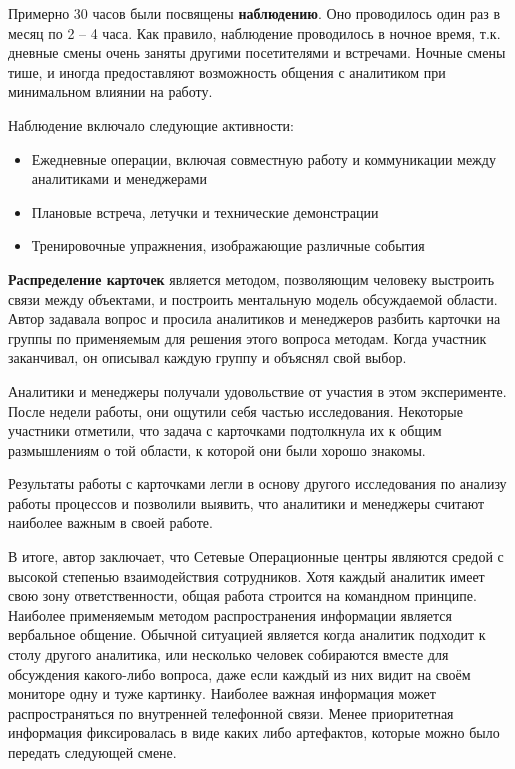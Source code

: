 \documentclass[10pt,a4paper]{article}
\begin{document}
\begin{multicols}{2}
Примерно 30 часов были посвящены \textbf{наблюдению}. Оно проводилось один раз в месяц по 2 -- 4 часа. Как правило, наблюдение проводилось в ночное время, т.к. дневные смены очень заняты другими посетителями и встречами. Ночные смены тише, и иногда предоставляют возможность общения с аналитиком при минимальном влиянии на работу.

Наблюдение включало следующие активности:
\begin{itemize}
\item Ежедневные операции, включая совместную работу и коммуникации между аналитиками и менеджерами
\item Плановые встреча, летучки и технические демонстрации
\item Тренировочные упражнения, изображающие различные события
\end{itemize}

\textbf{Распределение карточек} является методом, позволяющим человеку выстроить связи между объектами, и построить ментальную модель обсуждаемой области. Автор задавала вопрос и просила аналитиков и менеджеров разбить карточки на группы по применяемым для решения этого вопроса методам. Когда участник заканчивал, он описывал каждую группу и объяснял свой выбор.

Аналитики и менеджеры получали удовольствие от участия в этом эксперименте. После недели работы, они ощутили себя частью исследования. Некоторые участники отметили, что задача с карточками подтолкнула их к общим размышлениям о той области, к которой они были хорошо знакомы.

Результаты работы с карточками легли в основу другого исследования по анализу работы процессов и позволили выявить, что аналитики и менеджеры считают наиболее важным в своей работе.

В итоге, автор заключает, что Сетевые Операционные центры являются средой с высокой степенью взаимодействия сотрудников. Хотя каждый аналитик имеет свою зону ответственности, общая работа строится на командном принципе. Наиболее применяемым методом распространения информации является вербальное общение. Обычной ситуацией является когда аналитик подходит к столу другого аналитика, или несколько человек собираются вместе для обсуждения какого-либо вопроса, даже если каждый из них видит на своём мониторе одну и туже картинку. Наиболее важная информация может распространяться по внутренней телефонной связи. Менее приоритетная информация фиксировалась в виде каких либо артефактов, которые можно было передать следующей смене.


\end{multicols}
\end{document}
